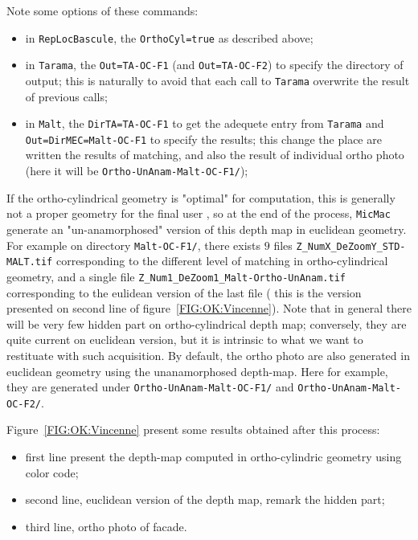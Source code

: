Note some options of these commands:

\begin{itemize}
   \item in {\tt RepLocBascule}, the {\tt OrthoCyl=true} as described above;
   \item in {\tt Tarama}, the {\tt Out=TA-OC-F1} (and {\tt Out=TA-OC-F2}) to specify the
         directory of output; this is naturally to avoid that each call to {\tt Tarama} overwrite
         the result of previous calls;
   \item in {\tt Malt}, the {\tt DirTA=TA-OC-F1} to get the adequete entry from  {\tt Tarama}
         and {\tt Out=DirMEC=Malt-OC-F1} to specify the results; this change the place are written
         the results of matching, and also the result of individual ortho photo (here it will be
         {\tt Ortho-UnAnam-Malt-OC-F1/});
\end{itemize}


If the ortho-cylindrical geometry is "optimal" for computation, this is
generally not a proper geometry for the final user , so at the end of the process,
{\tt MicMac} generate an "un-anamorphosed" version of this depth map in
euclidean geometry.  For example on directory {\tt Malt-OC-F1/}, there
exists $9$ files {\tt Z\_NumX\_DeZoomY\_STD-MALT.tif} corresponding to
the different level of matching in ortho-cylindrical geometry,
and a single file {\tt Z\_Num1\_DeZoom1\_Malt-Ortho-UnAnam.tif}
corresponding to the eulidean version of the last file
( this is the version presented on second line of
figure~\ref{FIG:OK:Vincenne}).
Note that in general there will be very few hidden part on
ortho-cylindrical depth map; conversely, they are quite current on
euclidean version, but it is intrinsic to what we want to restituate
with such acquisition.
By default, the ortho photo are also generated in euclidean geometry
using the unanamorphosed depth-map. Here for example, they are
generated under {\tt Ortho-UnAnam-Malt-OC-F1/} and {\tt Ortho-UnAnam-Malt-OC-F2/}.


Figure~\ref{FIG:OK:Vincenne} present some results obtained after this process:

\begin{itemize}
    \item first line present the depth-map computed in ortho-cylindric geometry using
           color code;
    \item  second line, euclidean version of the depth map, remark the hidden part;

    \item  third line, ortho photo of facade.
\end{itemize}

